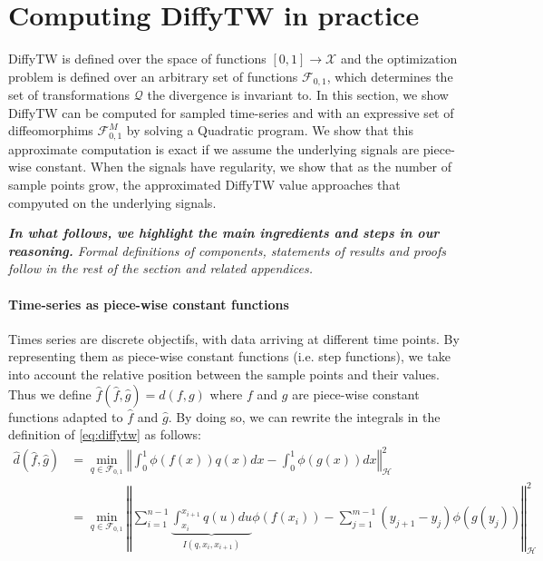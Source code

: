 \section{Computing DiffyTW in practice}\label{sec:computing-diffytw}
DiffyTW is defined over the space of functions $[0,1] \to \mathcal X$ and the optimization problem is defined over an arbitrary set of functions $\mathcal F_{0,1}$, which determines the set of transformations $\mathcal Q$ the divergence is invariant to. In this section, we show DiffyTW can be computed for sampled time-series and with an expressive set of diffeomorphims $\mathcal F_{0,1}^M$ by solving a Quadratic program. We show that this approximate computation is exact if we assume the underlying signals are piece-wise constant. When the signals have regularity, we show that as the number of sample points grow, the approximated DiffyTW value approaches that compyuted on the underlying signals.

\emph{\textbf{In what follows, we highlight the main ingredients and steps in our reasoning.} Formal definitions of components, statements of results and proofs follow in the rest of the section and related appendices.}

\paragraph{Time-series as piece-wise constant functions} Times series are discrete objectifs, with data arriving at different time points. By representing them as piece-wise constant functions (i.e. step functions), we take into account the relative position between the sample points and their values. %
Thus we define $\hat f(\hat f, \hat g) =d(f, g)$ where $f$ and $g$ are piece-wise constant functions adapted to $\hat f$ and $\hat g$. By doing so, we can rewrite the integrals in the definition of \cref{eq:diffytw} as follows:
\begin{align}
    \hat d(\hat f, \hat g) &= \min_{q \in \mathcal F_{0,1}}\left\Vert \int_0^1 \phi(f(x))q(x)dx - \int_0^1\phi(g(x))dx\right\Vert^2_\mathcal H\label{eq:diffytw-step-1}\\
            &\label{eq:diffytw-step-2}= \min_{q\in\mathcal F_{0,1}} \left \Vert \sum_{i=1}^{n-1} \underbrace{\int_{x_i}^{x_{i+1}}q(u)du}_{I(q, x_i, x_{i+1})} \phi(f(x_i)) - \sum_{j=1}^{m-1} (y_{j+1} - y_j)\phi(g(y_j))\right\Vert_\mathcal H^2
\end{align}

